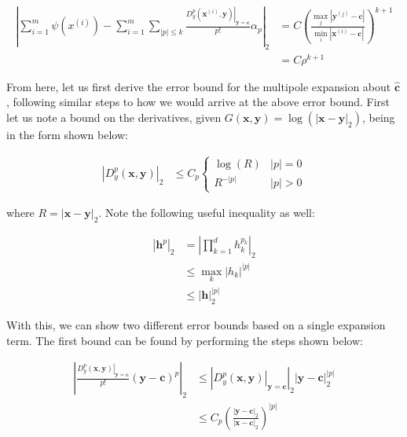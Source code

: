 \documentclass{article}[11pt]
\newcommand{\bvec}[1]{\boldsymbol{#1}}
\begin{document}
   \begin{align*}
    \left| \sum_{i=1}^m \psi(x^{(i)}) - \sum_{i=1}^m \sum_{|p| \leq k} \frac{ \left. D_{y}^{p}(\bvec{x}^{(i)},\bvec{y}) \right|_{\bvec{y}=\bvec{c}}}{p!} \alpha_p \right|_2 &= C \left( \frac{\max_{j} |\bvec{y}^{(j)} - \bvec{c}|}{\min_i |\bvec{x}^{(i)} - \bvec{c}|} \right)^{k+1} \\
    &= C \rho^{k+1}
   \end{align*}
   
   From here, let us first derive the error bound for the multipole expansion about $\bvec{\hat{c}}$, following similar steps to how we would arrive at the above error bound. First let us note a bound on the derivatives, given $G(\bvec{x},\bvec{y}) = \log\left(|\bvec{x} - \bvec{y}|_2\right)$, being in the form shown below:

   \begin{align*}
    \left| D^{p}_y (\bvec{x},\bvec{y}) \right|_2 &\leq C_p 
      \begin{cases}
        \log(R) & |p| = 0 \\
        R^{-|p|} & |p| > 0
      \end{cases}
   \end{align*}

   where $R = |\bvec{x} - \bvec{y}|_2$. Note the following useful inequality as well:

   \begin{align*}
    \left| \bvec{h}^p \right|_2 &= \left| \prod_{k=1}^d h_k^{p_k}\right|_2 \\
    & \leq \max_k \left| h_k\right|^{|p|} \\
    & \leq \left| \bvec{h} \right|_2^{|p|}
   \end{align*}

   With this, we can show two different error bounds based on a single expansion term. The first bound can be found by performing the steps shown below:

   \begin{align*}
    \left| \frac{ \left. D_{y}^{p}(\bvec{x},\bvec{y}) \right|_{\bvec{y}=\bvec{c}}}{p!} \left(\bvec{y} - \bvec{c}\right)^p \right|_2 &\leq \left| \left. D_{y}^{p}(\bvec{x},\bvec{y}) \right|_{\bvec{y}=\bvec{c}} \right|_2 \left| \bvec{y} - \bvec{c} \right|_2^{|p|} \\
    &\leq C_p \left(\frac{\left| \bvec{y} - \bvec{c} \right|_2}{\left| \bvec{x} - \bvec{c} \right|_2} \right)^{|p|}
   \end{align*}
\end{document}
